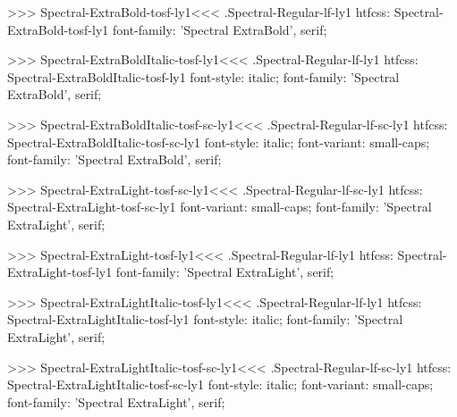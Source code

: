 >>>
\<Spectral-ExtraBold-tosf-ly1\><<<
.Spectral-Regular-lf-ly1
htfcss:  Spectral-ExtraBold-tosf-ly1  font-family: 'Spectral ExtraBold', serif;

>>>
\<Spectral-ExtraBoldItalic-tosf-ly1\><<<
.Spectral-Regular-lf-ly1
htfcss:  Spectral-ExtraBoldItalic-tosf-ly1  font-style: italic; font-family: 'Spectral ExtraBold', serif;

>>>
\<Spectral-ExtraBoldItalic-tosf-sc-ly1\><<<
.Spectral-Regular-lf-sc-ly1
htfcss:  Spectral-ExtraBoldItalic-tosf-sc-ly1  font-style: italic; font-variant: small-caps; font-family: 'Spectral ExtraBold', serif;

>>>
\<Spectral-ExtraLight-tosf-sc-ly1\><<<
.Spectral-Regular-lf-sc-ly1
htfcss:  Spectral-ExtraLight-tosf-sc-ly1  font-variant: small-caps; font-family: 'Spectral ExtraLight', serif;

>>>
\<Spectral-ExtraLight-tosf-ly1\><<<
.Spectral-Regular-lf-ly1
htfcss:  Spectral-ExtraLight-tosf-ly1  font-family: 'Spectral ExtraLight', serif;

>>>
\<Spectral-ExtraLightItalic-tosf-ly1\><<<
.Spectral-Regular-lf-ly1
htfcss:  Spectral-ExtraLightItalic-tosf-ly1  font-style: italic; font-family: 'Spectral ExtraLight', serif;

>>>
\<Spectral-ExtraLightItalic-tosf-sc-ly1\><<<
.Spectral-Regular-lf-sc-ly1
htfcss:  Spectral-ExtraLightItalic-tosf-sc-ly1  font-style: italic; font-variant: small-caps; font-family: 'Spectral ExtraLight', serif;

